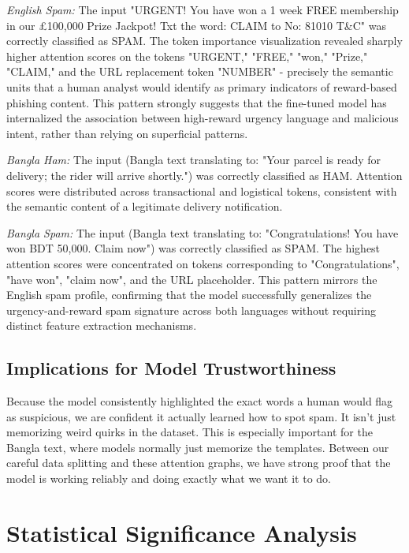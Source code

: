 \documentclass[journal]{IEEEtran}
\begin{document}
\textit{English Spam:} The input "URGENT! You have won a 1 week FREE
membership in our \pounds 100,000 Prize Jackpot! Txt the word: CLAIM to No:
81010 T\&C" was correctly classified as SPAM. The token importance
visualization revealed sharply higher attention scores on the tokens
"URGENT," "FREE," "won," "Prize," "CLAIM," and the URL replacement token
"NUMBER" - precisely the semantic units that a human analyst would
identify as primary indicators of reward-based phishing content. This
pattern strongly suggests that the fine-tuned model has internalized the
association between high-reward urgency language and malicious intent,
rather than relying on superficial patterns.

\textit{Bangla Ham:} The input (Bangla text translating to: "Your parcel is ready for delivery; the rider will arrive shortly.") was correctly classified as HAM. Attention scores were distributed across transactional and logistical tokens, consistent with the semantic content of a legitimate delivery notification.

\textit{Bangla Spam:} The input (Bangla text translating to: "Congratulations! You have won BDT 50,000. Claim now") was correctly classified as SPAM. The highest attention scores were concentrated on tokens corresponding to "Congratulations", "have won", "claim now", and the URL placeholder. This pattern mirrors the English spam profile, confirming that the model successfully generalizes the urgency-and-reward spam signature across both languages without requiring distinct feature extraction mechanisms.


\subsection{Implications for Model Trustworthiness}

Because the model consistently highlighted the exact words a human would flag as suspicious, we are confident it actually learned how to spot spam. It isn't just memorizing weird quirks in the dataset. This is especially important for the Bangla text, where models normally just memorize the templates. Between our careful data splitting and these attention graphs, we have strong proof that the model is working reliably and doing exactly what we want it to do.

\section{Statistical Significance Analysis}
\end{document}
